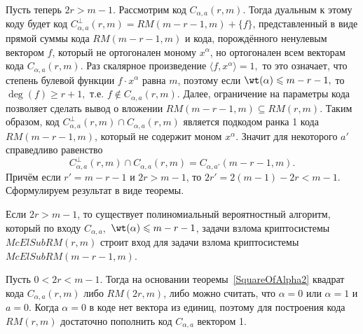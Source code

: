 Пусть теперь \(2r > m-1\).
Рассмотрим код \(C_{\alpha, a}(r,m)\).
Тогда дуальным к этому коду будет код \(C^{\perp}_{\alpha,a}(r,m)=RM(m-r-1,m) + \{f\}\), представленный в виде прямой суммы кода \(RM(m-r-1,m)\) и кода, порождённого ненулевым вектором \(f\), который не ортогонален моному \(x^{\alpha}\), но ортогонален всем векторам кода $C_{\alpha,a}(r,m)$.
Раз скалярное произведение \(\langle f, x^{\alpha}\rangle =1,\) то это означает, что степень булевой функции \(f\cdot x^{\alpha}\) равна \(m\), поэтому если \(\wt(\alpha)\leqslant m - r -1,\) то \(\deg(f) \geqslant r + 1,\) т.е.
\(f\not\in C_{\alpha, a}(r,m)\).
Далее, ограничение на параметры кода позволяет сделать вывод о вложении \(RM(m-r-1,m)\subseteq RM(r,m)\).
Таким образом, код \(C^{\perp}_{\alpha, a}(r,m)\cap C_{\alpha, a}(r,m)\) является подкодом ранка 1 кода \(RM(m-r-1, m)\), который не содержит моном \(x^{\alpha}\).
Значит для некоторого \(a'\) справедливо равенство
\[
	C^{\perp}_{\alpha, a}(r,m)\cap C_{\alpha, a}(r,m) = C_{\alpha, a'}(m-r-1, m).
\]
Причём если \(r'=m-r-1\) и \(2r > m - 1\), то \(2r' = 2 (m-1) - 2r < m - 1.\)
Сформулируем результат в виде теоремы.

\begin{theorem}
	\label{th_2r_greate_m_minus_1}
	Если \(2r>m-1\), то существует полиномиальный вероятностный алгоритм, который по входу \(C_{\alpha, a},\) \(\wt(\alpha)\leqslant m - r - 1\), задачи взлома криптосистемы \(McElSubRM(r,m)\) строит вход для задачи взлома криптосистемы \(McElSubRM(m-r-1,m)\).

\end{theorem}

Пусть \(0< 2r < m-1\).
Тогда на основании теоремы~\ref{SquareOfAlpha2} квадрат кода \(C_{\alpha, a}(r,m)\) либо \(RM(2r,m)\), либо можно считать, что \(\alpha=0\) или \(\alpha=1\) и \(a=0\).
Когда \(\alpha=0\) в коде нет вектора из единиц, поэтому для построения кода \(RM(r,m)\) достаточно пополнить код \(C_{\alpha,a}\) вектором 1.

